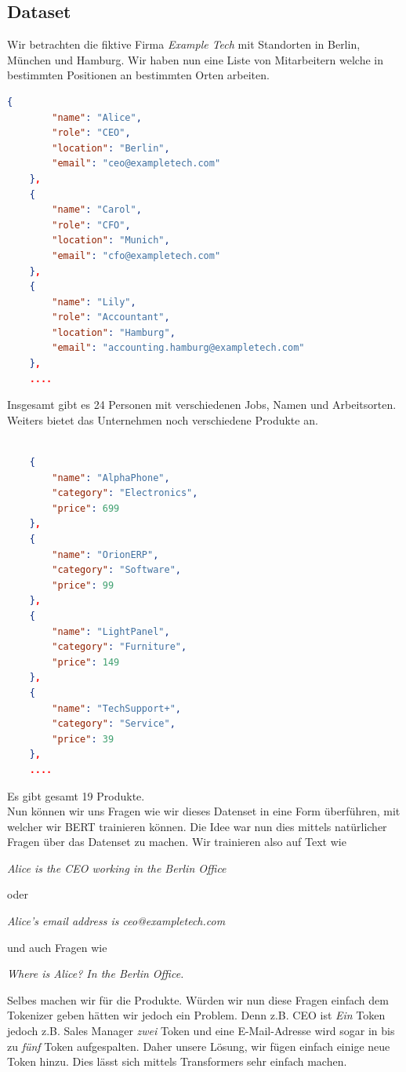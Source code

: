 \documentclass[a4paper, 11pt]{article}          %
\begin{document}
\subsection{Dataset}
Wir betrachten die fiktive Firma \emph{Example Tech} mit Standorten in Berlin, München und Hamburg. Wir haben nun eine Liste von Mitarbeitern welche in bestimmten Positionen an bestimmten Orten arbeiten.
\begin{lstlisting}[language = json]
    { 
        "name": "Alice", 
        "role": "CEO", 
        "location": "Berlin", 
        "email": "ceo@exampletech.com" 
    },
    { 
        "name": "Carol", 
        "role": "CFO", 
        "location": "Munich", 
        "email": "cfo@exampletech.com" 
    },
    { 
        "name": "Lily", 
        "role": "Accountant", 
        "location": "Hamburg", 
        "email": "accounting.hamburg@exampletech.com" 
    },
    ....
\end{lstlisting}
Insgesamt gibt es 24 Personen mit verschiedenen Jobs, Namen und Arbeitsorten. Weiters bietet das Unternehmen noch verschiedene Produkte an.
\begin{lstlisting}[language = json]

    { 
        "name": "AlphaPhone", 
        "category": "Electronics", 
        "price": 699 
    },
    { 
        "name": "OrionERP", 
        "category": "Software", 
        "price": 99 
    },
    { 
        "name": "LightPanel", 
        "category": "Furniture", 
        "price": 149 
    },
    { 
        "name": "TechSupport+", 
        "category": "Service", 
        "price": 39 
    },
    ....
\end{lstlisting}
Es gibt gesamt 19 Produkte.
\medskip \\
Nun können wir uns Fragen wie wir dieses Datenset in eine Form überführen, mit welcher wir BERT trainieren können. Die Idee war nun dies mittels natürlicher Fragen über das Datenset zu machen. Wir trainieren also auf Text wie 
\begin{center}
    \emph{Alice is the CEO working in the Berlin Office}
\end{center}
oder 
\begin{center}
    \emph{Alice's email address is ceo@exampletech.com}
\end{center}
und auch Fragen wie 
\begin{center}
    \emph{Where is Alice? In the Berlin Office.}
\end{center}
\medskip
Selbes machen wir für die Produkte. Würden wir nun diese Fragen einfach dem Tokenizer geben hätten wir jedoch ein Problem. Denn z.B. CEO ist \emph{Ein} Token jedoch z.B. Sales Manager \emph{zwei} Token und eine E-Mail-Adresse wird sogar in bis zu \emph{fünf} Token aufgespalten. Daher unsere Lösung, wir fügen einfach einige neue Token hinzu. Dies lässt sich mittels Transformers sehr einfach machen.
\end{document}
